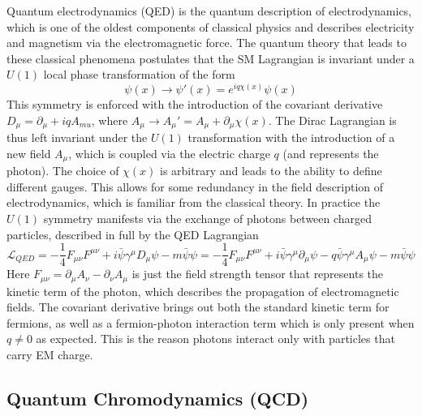 Quantum electrodynamics (QED) is the quantum description of electrodynamics, which is one of the oldest 
components of classical physics and describes electricity and magnetism via the electromagnetic force. The 
quantum theory that leads to these classical phenomena postulates that the SM Lagrangian is invariant under a 
$U(1)$ local phase transformation of the form 
\begin{equation}
\psi(x) \rightarrow \psi'(x) = e^{iq\chi(x)}\psi(x)
\end{equation}
This symmetry is enforced with the introduction of the covariant derivative $D_{\mu} = \partial_{\mu} + iqA_{mu}$, 
where $A_{\mu} \rightarrow A_{\mu}' = A_{\mu} + \partial_{\mu}\chi(x)$. The Dirac Lagrangian is thus left invariant 
under the $U(1)$ transformation with the introduction of a new field $A_{\mu}$, which is coupled via the electric 
charge $q$ (and represents the photon). The choice of $\chi(x)$ is arbitrary and leads to the ability to define 
different gauges. This allows for some redundancy in the field description of electrodynamics, which is familiar from 
the classical theory. In practice the $U(1)$ symmetry manifests via the exchange of photons between charged 
particles, described in full by the QED Lagrangian
\begin{equation}
\mathcal{L}_{QED} = - \frac{1}{4}F_{\mu\nu}F^{\mu\nu} + i\bar{\psi}\gamma^{\mu}D_{\mu}\psi - m\bar{\psi}\psi =
- \frac{1}{4}F_{\mu\nu}F^{\mu\nu} + i\bar{\psi}\gamma^{\mu}\partial_{\mu}\psi - q\bar{\psi}\gamma^{\mu}A_{\mu}\psi - m\bar{\psi}\psi
\end{equation}
Here $F_{\mu\nu} = \partial_{\mu}A_{\nu}  - \partial_{\nu}A_{\mu}$ is just the field strength tensor that represents 
the kinetic term of the photon, which describes the propagation of electromagnetic fields. The covariant derivative 
brings out both the standard kinetic term for fermions, as well as a fermion-photon interaction term which is only 
present when $q \neq 0$ as expected. This is the reason photons interact only with particles that carry EM charge.

\subsection{Quantum Chromodynamics (QCD)}


